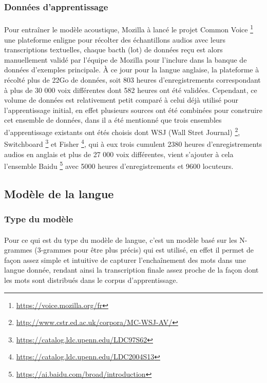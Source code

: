 		\subsubsection*{Données d'apprentissage}
		\paragraph{}
		Pour entraîner le modèle acoustique, Mozilla à lancé le projet Common Voice  \footnote{\url{https://voice.mozilla.org/fr}} une plateforme enligne pour récolter des échantillons audios avec leurs transcriptions textuelles, chaque bacth (lot) de données reçu est alors manuellement validé par l'équipe de Mozilla pour l'inclure dans la banque de données d'exemples principale. À ce jour pour la langue anglaise, la plateforme à récolté plus de 22Go de données, soit 803 heures d'enregistrements correspondant à plus de 30 000 voix différentes dont 582 heures ont été validées. Cependant, ce volume de données est relativement petit comparé à celui déjà utilisé pour l'apprentissage initial, en effet plusieurs sources ont été combinées pour construire cet ensemble de données, dans \cite{deepspeech_paper} il a été mentionné que trois ensembles d'apprentissage existants ont étés choisis dont WSJ (Wall Stret Journal) \footnote{\url{http://www.cstr.ed.ac.uk/corpora/MC-WSJ-AV/}}, Switchboard \footnote{\url{https://catalog.ldc.upenn.edu/LDC97S62}} et Fisher \footnote{\url{https://catalog.ldc.upenn.edu/LDC2004S13}}, qui à eux trois cumulent 2380 heures d'enregistrements audios en anglais et plus de 27 000 voix différentes, vient s'ajouter à cela l'ensemble Baidu \footnote{\url{https://ai.baidu.com/broad/introduction}} avec 5000 heures d'enregistrements et 9600 locuteurs.
		
	\subsection{Modèle de la langue}
		\subsubsection*{Type du modèle}
		\paragraph{}
		Pour ce qui est du type du modèle de langue, c'est un modèle basé sur les N-grammes (3-grammes pour être plus précis) qui est utilisé, en effet il permet de façon assez simple et intuitive de capturer l'enchaînement des mots dans une langue donnée, rendant ainsi la transcription finale assez proche de la façon dont les mots sont distribués dans le corpus d'apprentissage.
		
